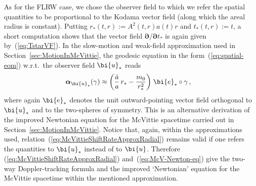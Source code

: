 \documentclass
[rmp,aps,twocolumn,showpacs,preprintnumbers,amsmath,amssymb]{revtex4}
\theoremstyle{plain}
\theoremstyle{definition}
\theoremstyle{remark}
\newcommand{\bpartial}{\boldsymbol{\partial}} %
\newcommand{\be}{\bi{e}}
\newcommand{\bu}{\bi{u}}
\newcommand{\balpha}{\boldsymbol{\alpha}}
\begin{document}
As for the FLRW case, we chose the observer field to which we refer 
the spatial quantities to be proportional to the Kodama vector field 
(along which the areal radius is constant). Putting 
$r_*(t,r):=A^2(t,r)a(t)r$ and $t_*(t,r):=t$, a short computation 
shows that the vector field $\bpartial/\bpartial t_*$ is again 
given by~(\ref{eq:TstarVF}). In the slow-motion and weak-field 
approximation used in Section~\ref{sec:MotionInMcVittie}, the 
geodesic equation in the form~(\ref{eq:spatial-eom}) w.r.t.~the 
observer field $\bu_*$ reads 
%
\begin{equation}\label{eq:McV-Newton-eq}
  \balpha_{\bu_*}(\gamma) \approx 
  \bigg( \frac{\ddot a}{a}\, r_* - \frac{m_0}{r_*^2} \bigg) \;\be_* 
  \circ \gamma \,,
\end{equation}
%
where again $\be_*$ denotes the unit outward-pointing vector field 
orthogonal to $\bu_*$ and to the two-spheres of symmetry. This is an 
alternative derivation of the improved Newtonian equation for the 
McVittie spacetime carried out in Section~\ref{sec:MotionInMcVittie}. 
Notice that, again, within the approximations used, 
relation~(\ref{eq:McVittieShiftRateApproxRadial}) remains valid if one 
refers the quantities to $\bu_*$ instead of to $\bu$. Therefore
(\ref{eq:McVittieShiftRateApproxRadial}) and~(\ref{eq:McV-Newton-eq}) 
give the two-way Doppler-tracking formula and the improved 
`Newtonian' equation for the McVittie spacetime within the mentioned 
approximation. 
\end{document}
